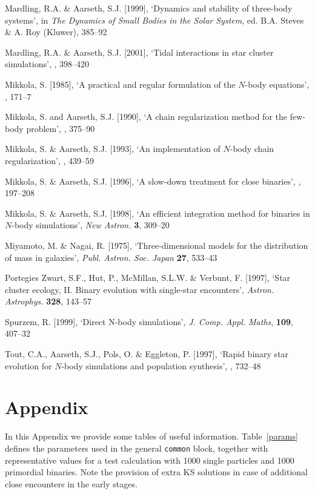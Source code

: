 \documentclass[12pt]{article}
\begin{document}
\medskip
\noindent
Mardling, R.A. \& Aarseth, S.J. [1999], `Dynamics and stability of three-body systems',
in {\it The Dynamics of Small Bodies in the Solar System}, ed. B.A. Steves \& A. Roy
(Kluwer), 385--92

\medskip
\noindent
Mardling, R.A. \& Aarseth, S.J. [2001], `Tidal interactions in star cluster simulations',
, 398--420

\medskip
\noindent
Mikkola, S. [1985], `A practical and regular formulation of the $N$-body equations',
, 171--7

\medskip
\noindent
Mikkola, S. and Aarseth, S.J. [1990], `A chain regularization method for the
few-body problem',
, 375--90

\medskip
\noindent
Mikkola, S. \& Aarseth, S.J. [1993], `An implementation of $N$-body chain
\hbox{regularization',}
, 439--59

\medskip
\noindent
Mikkola, S. \& Aarseth, S.J. [1996], `A slow-down treatment for close binaries',
, 197--208

\medskip
\noindent
Mikkola, S. \& Aarseth, S.J. [1998], `An efficient integration method for
binaries in $N$-body simulations',
{\it New Astron.} {\bf 3}, 309--20

\medskip
\noindent
Miyamoto, M. \& Nagai, R. [1975], `Three-dimensional models for the distribution
of mass in galaxies', {\it Publ. Astron. Soc. Japan} {\bf 27}, 533--43

\medskip
\noindent
Portegies Zwart, S.F., Hut, P., McMillan, S.L.W. \& Verbunt, F. [1997],
`Star cluster ecology, II. Binary evolution with single-star encounters',
{\it Astron. Astrophys.} {\bf 328}, 143--57

\medskip
\noindent
Spurzem, R. [1999], `Direct N-body simulations',
{\it J. Comp. Appl. Maths}, {\bf 109}, 407--32

\medskip
\noindent
Tout, C.A., Aarseth, S.J., Pols, O. \& Eggleton, P. [1997], `Rapid binary
star evolution for $N$-body simulations and population synthesis',
, 732--48

\newpage

\section{Appendix}

In this Appendix we provide some tables of useful information.
Table~\ref{params} defines the parameters used in the general {\tt common}
block, together with representative values for a test calculation with 1000
single particles and 1000 primordial binaries. Note the provision of extra
KS solutions in case of additional close encounters in the early stages.
\end{document}
